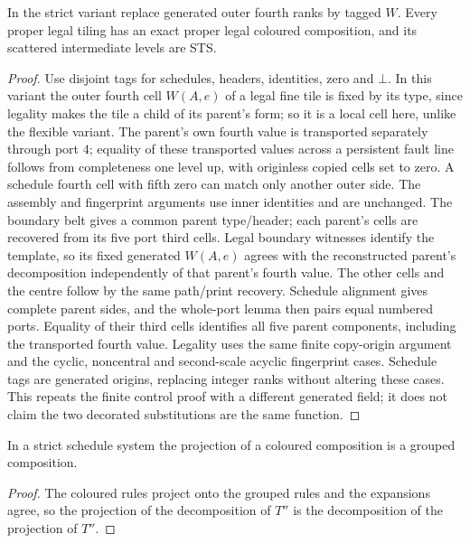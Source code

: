 \begin{lemma}\label{lem:schedule-compose}
In the strict variant replace generated outer fourth ranks by tagged $W$.
Every proper legal tiling has an exact proper legal coloured composition,
and its scattered intermediate levels are STS.
\end{lemma}
\begin{proof}
Use disjoint tags for schedules, headers, identities, zero and $\bot$.
In this variant the outer fourth cell $W(A,e)$ of a legal fine tile is
fixed by its type, since legality makes the tile a child of its parent's
form; so it is a local cell here, unlike the flexible variant. The parent's
own fourth value is transported separately through port $4$; equality of
these transported values across a persistent fault line follows from
completeness one level up, with originless copied cells set to zero.
A schedule fourth cell with fifth zero can match only another outer side.
The assembly and fingerprint arguments use inner identities and are unchanged.
The boundary belt gives a common parent type/header; each parent's cells
are recovered from its five port third cells. Legal boundary witnesses
identify the template, so its fixed generated $W(A,e)$ agrees with the
reconstructed parent's decomposition independently of that parent's fourth
value. The other cells and the centre follow by the same path/print recovery.
Schedule alignment gives complete parent sides, and the whole-port lemma
then pairs equal numbered ports. Equality of their third cells identifies
all five parent components, including the transported fourth value.
Legality uses the same finite copy-origin argument and the cyclic,
noncentral and second-scale acyclic fingerprint cases. Schedule tags are
generated origins, replacing integer ranks without altering these cases.
This repeats the finite control proof with a different generated field;
it does not claim the two decorated substitutions are the same function.
\end{proof}

\begin{lemma}\label{lem:strict-projection}
In a strict schedule system the projection of a coloured composition is a
grouped composition.
\end{lemma}
\begin{proof}
The coloured rules project onto the grouped rules and the expansions agree,
so the projection of the decomposition of $T''$ is the decomposition of the
projection of $T''$.
\end{proof}

